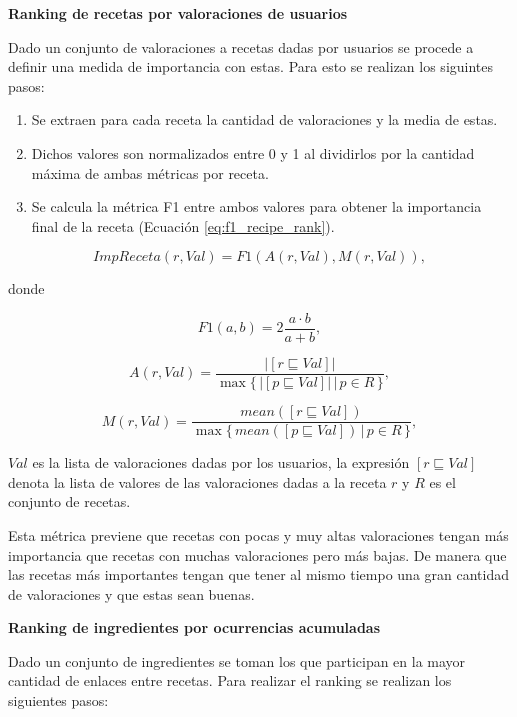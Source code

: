 \documentclass[
	a4paper, %
	10pt, %
	unnumberedsections, %
	twoside, %
]{LTJournalArticle}
\begin{document}
\textbf{Ranking de recetas por valoraciones de usuarios}

Dado un conjunto de valoraciones a recetas dadas por usuarios se procede a definir 
una medida de importancia con estas. Para esto se realizan los siguintes pasos:

\begin{enumerate}
	\item Se extraen para cada receta la cantidad de valoraciones y la media de estas.
	\item Dichos valores son normalizados entre 0 y 1 al dividirlos por la cantidad máxima de ambas métricas por receta.
	\item Se calcula la métrica F1 entre ambos valores para obtener la importancia final de la receta (Ecuación \ref{eq:f1_recipe_rank}).
\end{enumerate}

\begin{equation}
	ImpReceta(r, Val) = F1(A(r, Val), M(r, Val)),
	\label{eq:f1_recipe_rank}
\end{equation}

donde

\begin{equation*}
	F1(a, b) = 2 \frac{a · b}{a + b},
\end{equation*}

\begin{equation*}
	A(r, Val) = \frac{|[r \sqsubseteq Val]|}{\max \{\,|[p \sqsubseteq Val]| \, \vert \, p \in R \, \}},
\end{equation*}

\begin{equation*}
	M(r, Val) = \frac{mean([r \sqsubseteq Val])}{\max \{\,mean([p \sqsubseteq Val]) \, \vert \, p \in R\,\}},
\end{equation*}

$Val$ es la lista de valoraciones dadas por los usuarios, la expresión $[r \sqsubseteq Val]$ denota la lista de valores de 
las valoraciones dadas a la receta $r$ y $R$ es el conjunto de recetas.

Esta métrica previene que recetas con pocas y muy altas valoraciones tengan más importancia que recetas con muchas
valoraciones pero más bajas. De manera que las recetas más importantes tengan que tener al mismo tiempo una gran 
cantidad de valoraciones y que estas sean buenas. 

\textbf{Ranking de ingredientes por ocurrencias acumuladas}

Dado un conjunto de ingredientes se toman los que participan en la mayor cantidad de enlaces entre recetas.
Para realizar el ranking se realizan los siguientes pasos:
\end{document}
